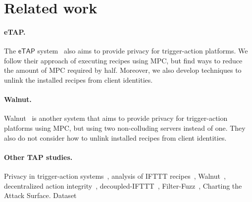 \section{Related work}
\label{sec:related}

\paragraph{eTAP.}
The $\mathsf{eTAP}$ system~\cite{DBLP:conf/sp/ChenCWSCF21} also aims to provide
privacy for trigger-action platforms. We follow their approach of executing
recipes using MPC, but find ways to reduce the amount of MPC required by
half. Moreover, we also develop techniques to unlink the installed recipes from
client identities.

\paragraph{Walnut.}


Walnut~\cite{DBLP:journals/corr/abs-2009-12447} is another system that aims to
provide privacy for trigger-action platforms using MPC, but using two
non-colluding servers instead of one. They also do not consider how to unlink
installed recipes from client identities.

\paragraph{Other TAP studies.}

Privacy in trigger-action systems~\cite{DBLP:conf/sp/ChenCWSCF21}, analysis of
IFTTT
recipes~\cite{DBLP:conf/chi/UrHBLMPSL16,DBLP:conf/www/SurbatovichABDJ17, DBLP:conf/imc/MiQZW17},
Walnut~\cite{DBLP:journals/corr/abs-2009-12447}, decentralized action
integrity~\cite{DBLP:conf/ndss/FernandesRJP18},
decoupled-IFTTT~\cite{DBLP:journals/corr/FernandesRJP17},
Filter-Fuzz~\cite{DBLP:journals/access/XuZZCDG19},
Charting the Attack Surface. \cite{DBLP:conf/ccs/WangDYL0G19}
Dataset~\cite{DBLP:journals/corr/abs-2110-00068}
